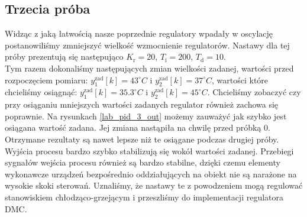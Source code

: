 \subsection{Trzecia próba}
\label{thermal_pid_proba_3}
Widząc z jaką łatwością nasze poprzednie regulatory wpadały w oscylację postanowiliśmy zmniejszyć wielkość wzmocnienie regulatorów. Nastawy dla tej próby prezentują się następująco $K_{\mathrm{r}} = 20$, $T_{\mathrm{i}} = 200$, $ T_{\mathrm{d}} = 10$. 
\\ \indent  Tym razem dokonaliśmy następujących zmian wielkości zadanej, wartości przed rozpoczęciem pomiaru: $y_{\mathrm{1}}^{\mathrm{zad}}[k] = 43^{\circ} C$ i $y_{\mathrm{2}}^{\mathrm{zad}}[k] = 37^{\circ} C$, wartości które chcieliśmy osiągnąć:  $y_{\mathrm{1}}^{\mathrm{zad}}[k] = \num{35.3}^{\circ} C$ i $y_{\mathrm{2}}^{\mathrm{zad}}[k] = 45^{\circ} C$. Chcieliśmy zobaczyć czy przy osiąganiu mniejszych wartości zadanych regulator również zachowa się poprawnie. Na rysunkach \ref{lab_pid_3_out} możemy zauważyć jak szybko jest osiągana wartość zadana. Jej zmiana nastąpiła na chwilę przed próbką $0$. Otrzymane rezultaty są nawet lepsze niż te osiągane podczas drugiej próby. Wyjścia procesu bardzo szybko stabilizują się wokół wartości zadanej. Przebiegi sygnałów wejścia procesu również są bardzo stabilne, dzięki czemu elementy wykonawcze urządzeń bezpośrednio oddziałujących na obiekt nie są narażone na wysokie skoki sterowań. Uznaliśmy, że nastawy te z powodzeniem mogą regulować stanowiskiem chłodząco-grzejącym i przeszliśmy do implementacji regulatora DMC.


